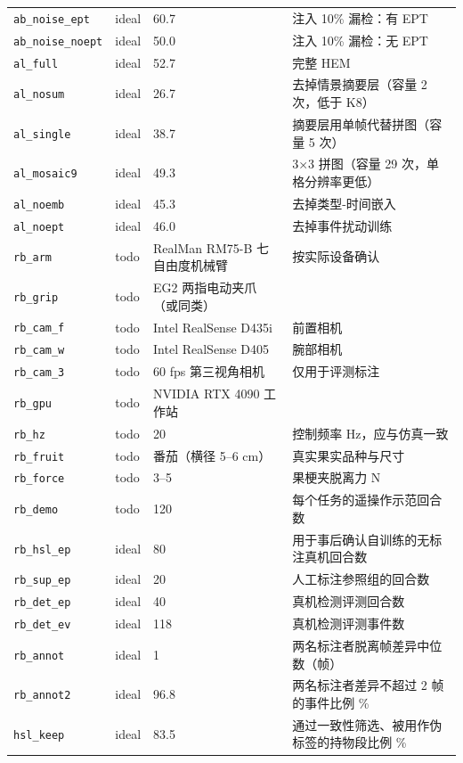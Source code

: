 \begin{longtable}{p{3.2cm}p{0.9cm}p{4.2cm}p{6.2cm}}
\texttt{ab\_noise\_ept} & ideal & 60.7 & 注入 10\% 漏检：有 EPT\\
\texttt{ab\_noise\_noept} & ideal & 50.0 & 注入 10\% 漏检：无 EPT\\
\texttt{al\_full} & ideal & 52.7 & 完整 HEM\\
\texttt{al\_nosum} & ideal & 26.7 & 去掉情景摘要层（容量 2 次，低于 K8）\\
\texttt{al\_single} & ideal & 38.7 & 摘要层用单帧代替拼图（容量 5 次）\\
\texttt{al\_mosaic9} & ideal & 49.3 & 3×3 拼图（容量 29 次，单格分辨率更低）\\
\texttt{al\_noemb} & ideal & 45.3 & 去掉类型-时间嵌入\\
\texttt{al\_noept} & ideal & 46.0 & 去掉事件扰动训练\\
\texttt{rb\_arm} & todo & RealMan RM75-B 七自由度机械臂 & 按实际设备确认\\
\texttt{rb\_grip} & todo & EG2 两指电动夹爪（或同类） & \\
\texttt{rb\_cam\_f} & todo & Intel RealSense D435i & 前置相机\\
\texttt{rb\_cam\_w} & todo & Intel RealSense D405 & 腕部相机\\
\texttt{rb\_cam\_3} & todo & 60 fps 第三视角相机 & 仅用于评测标注\\
\texttt{rb\_gpu} & todo & NVIDIA RTX 4090 工作站 & \\
\texttt{rb\_hz} & todo & 20 & 控制频率 Hz，应与仿真一致\\
\texttt{rb\_fruit} & todo & 番茄（横径 5--6 cm） & 真实果实品种与尺寸\\
\texttt{rb\_force} & todo & 3--5 & 果梗夹脱离力 N\\
\texttt{rb\_demo} & todo & 120 & 每个任务的遥操作示范回合数\\
\texttt{rb\_hsl\_ep} & ideal & 80 & 用于事后确认自训练的无标注真机回合数\\
\texttt{rb\_sup\_ep} & ideal & 20 & 人工标注参照组的回合数\\
\texttt{rb\_det\_ep} & ideal & 40 & 真机检测评测回合数\\
\texttt{rb\_det\_ev} & ideal & 118 & 真机检测评测事件数\\
\texttt{rb\_annot} & ideal & 1 & 两名标注者脱离帧差异中位数（帧）\\
\texttt{rb\_annot2} & ideal & 96.8 & 两名标注者差异不超过 2 帧的事件比例 \%\\
\texttt{hsl\_keep} & ideal & 83.5 & 通过一致性筛选、被用作伪标签的持物段比例 \%\\

\end{longtable}
